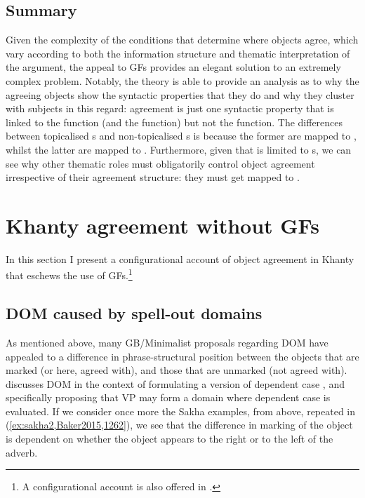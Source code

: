 \documentclass[output=paper
,modfonts
,nonflat]{langsci/langscibook}
\begin{document}
\subsection{Summary}

Given the complexity of the conditions that determine where objects agree,\linebreak
which vary according to both the information structure and thematic interpretation of the argument, the appeal to GFs provides an elegant solution to an extremely complex problem.
Notably, the theory is able to provide an analysis as to why the agreeing objects show the syntactic properties that they do and why they cluster with subjects in this regard: agreement is just one syntactic property that is linked to the \object{} function (and the \subj{} function) but not the \robj{} function.
The differences between topicalised \theme s and non-topicalised \theme s is because the former are mapped to \object, whilst the latter are mapped to \robj.
Furthermore, given that \robj{} is limited to \theme s, we can see why other thematic roles must obligatorily control object agreement irrespective of their agreement structure: they must get mapped to \object.

\section{Khanty agreement without GFs}\label{reanalysis}

In this section I present a configurational account of object agreement in Khanty that eschews the use of GFs.\footnote{A configurational account is also offered in \citet{barany2016b}.}

\subsection{DOM caused by spell-out domains}

As mentioned above, many GB/Minimalist proposals regarding DOM have appealed to a difference in phrase-structural position between the objects that are marked (or here, agreed with), and those that are unmarked (not agreed with).
\citet{Baker2015} discusses DOM in the context of formulating a version of dependent case \citep{Marantz1991}, and specifically proposing that VP may form a domain where dependent case is evaluated.
If we consider once more the Sakha examples, from above, repeated in (\ref{ex:sakha2,Baker2015,1262}), we see that the difference in marking of the object is dependent on whether the object appears to the right or to the left of the adverb.
\end{document}
